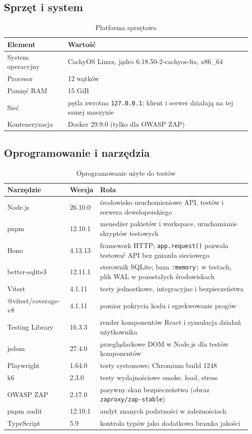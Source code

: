 \documentclass[a4paper,11pt]{article}
\newcommand{\code}[1]{\texttt{\small #1}}
\begin{document}
\subsection{Sprzęt i system}
\begin{table}[H]
\centering\small
\begin{tabularx}{\textwidth}{@{}l L@{}}
\toprule
\textsf{\textbf{Element}} & \textsf{\textbf{Wartość}}\\
\midrule
System operacyjny & CachyOS Linux, jądro 6.18.50-2-cachyos-lts, x86\_64\\
Procesor & 12 wątków\\
Pamięć RAM & 15 GiB\\
Sieć & pętla zwrotna \code{127.0.0.1}; klient i serwer działają na tej samej maszynie\\
Konteneryzacja & Docker 29.9.0 (tylko dla OWASP ZAP)\\
\bottomrule
\end{tabularx}
\caption{Platforma sprzętowa}
\end{table}

\subsection{Oprogramowanie i narzędzia}
\begin{table}[H]
\centering\small
\begin{tabularx}{\textwidth}{@{}l l L@{}}
\toprule
\textsf{\textbf{Narzędzie}} & \textsf{\textbf{Wersja}} & \textsf{\textbf{Rola}}\\
\midrule
Node.js & 26.10.0 & środowisko uruchomieniowe API, testów i serwera deweloperskiego\\
pnpm & 12.10.1 & menedżer pakietów i workspace, uruchamianie skryptów testowych\\
Hono & 4.13.13 & framework HTTP; \code{app.request()} pozwala testować API bez gniazda sieciowego\\
better-sqlite3 & 12.11.1 & sterownik SQLite; baza \code{:memory:} w testach, plik WAL w pozostałych środowiskach\\
Vitest & 4.1.11 & testy jednostkowe, integracyjne i bezpieczeństwa\\
@vitest/coverage-v8 & 4.1.11 & pomiar pokrycia kodu i egzekwowanie progów\\
Testing Library & 16.3.3 & render komponentów React i symulacja działań użytkownika\\
jsdom & 27.4.0 & przeglądarkowe DOM w Node.js dla testów komponentów\\
Playwright & 1.64.0 & testy systemowe; Chromium build 1248\\
k6 & 2.3.0 & testy wydajnościowe smoke, load, stress\\
OWASP ZAP & 2.17.0 & pasywny skan bezpieczeństwa (obraz \code{zaproxy/zap-stable})\\
pnpm audit & 12.10.1 & audyt znanych podatności w zależnościach\\
TypeScript & 5.9 & kontrola typów jako dodatkowa bramka jakości\\
\bottomrule
\end{tabularx}
\caption{Oprogramowanie użyte do testów}
\end{table}
\end{document}
